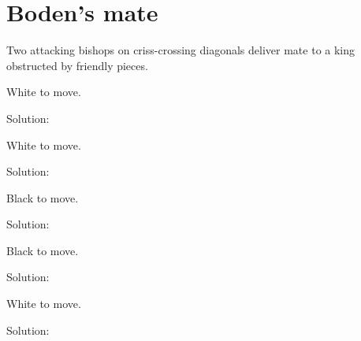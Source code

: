 \documentclass{book}
\begin{document}
\section{Boden's mate}
Two attacking bishops on criss-crossing diagonals deliver mate to a king obstructed by friendly pieces.\begin{multicols}{2} 
\begin{samepage} 
\newgame 


 
\showboard
 
 White to move. 
 
Solution: 
 
\end{samepage}\begin{samepage} 
\newgame 


 
\showboard
 
 White to move. 
 
Solution: 
 
\end{samepage}\begin{samepage} 
\newgame 


 
\showboard
 
 Black to move. 
 
Solution: 
 
\end{samepage}\begin{samepage} 
\newgame 


 
\showboard
 
 Black to move. 
 
Solution: 
 
\end{samepage}\begin{samepage} 
\newgame 


 
\showboard
 
 White to move. 
 
Solution: 
 

\end{samepage}
\end{multicols}
\end{document}
